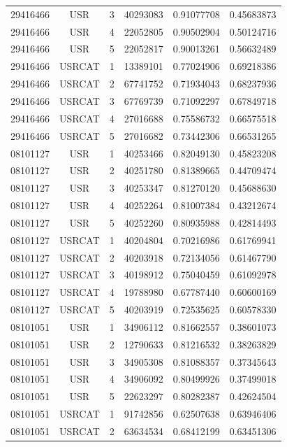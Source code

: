 \begin{longtable}{cccccc}
29416466 & USR    & 3 & 40293083 & 0.91077708 & 0.45683873\\
29416466 & USR    & 4 & 22052805 & 0.90502904 & 0.50124716\\
29416466 & USR    & 5 & 22052817 & 0.90013261 & 0.56632489\\
29416466 & USRCAT & 1 & 13389101 & 0.77024906 & 0.69218386\\%
29416466 & USRCAT & 2 & 67741752 & 0.71934043 & 0.68237936\\
29416466 & USRCAT & 3 & 67769739 & 0.71092297 & 0.67849718\\
29416466 & USRCAT & 4 & 27016688 & 0.75586732 & 0.66575518\\
29416466 & USRCAT & 5 & 27016682 & 0.73442306 & 0.66531265\\
\hline
08101127 & USR    & 1 & 40253466 & 0.82049130 & 0.45823208\\%
08101127 & USR    & 2 & 40251780 & 0.81389665 & 0.44709474\\
08101127 & USR    & 3 & 40253347 & 0.81270120 & 0.45688630\\
08101127 & USR    & 4 & 40252264 & 0.81007384 & 0.43212674\\
08101127 & USR    & 5 & 40252260 & 0.80935988 & 0.42814493\\
08101127 & USRCAT & 1 & 40204804 & 0.70216986 & 0.61769941\\%
08101127 & USRCAT & 2 & 40203918 & 0.72134056 & 0.61467790\\
08101127 & USRCAT & 3 & 40198912 & 0.75040459 & 0.61092978\\
08101127 & USRCAT & 4 & 19788980 & 0.67787440 & 0.60600169\\
08101127 & USRCAT & 5 & 40203919 & 0.72535625 & 0.60578330\\
\hline
08101051 & USR    & 1 & 34906112 & 0.81662557 & 0.38601073\\%
08101051 & USR    & 2 & 12790633 & 0.81216532 & 0.38263829\\
08101051 & USR    & 3 & 34905308 & 0.81088357 & 0.37345643\\
08101051 & USR    & 4 & 34906092 & 0.80499926 & 0.37499018\\
08101051 & USR    & 5 & 22623297 & 0.80282387 & 0.42624504\\
08101051 & USRCAT & 1 & 91742856 & 0.62507638 & 0.63946406\\%
08101051 & USRCAT & 2 & 63634534 & 0.68412199 & 0.63451306\\

\end{longtable}
